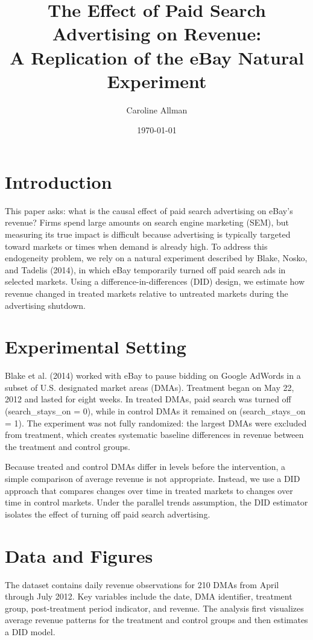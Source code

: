 \documentclass[12pt]{article}
\title{The Effect of Paid Search Advertising on Revenue: \\
A Replication of the eBay Natural Experiment}
\author{Caroline Allman}
\date{\today}
\begin{document}
\maketitle

\section{Introduction}
This paper asks: what is the causal effect of paid search advertising on eBay's revenue? Firms spend
large amounts on search engine marketing (SEM), but measuring its true impact is difficult because
advertising is typically targeted toward markets or times when demand is already high. To address this
endogeneity problem, we rely on a natural experiment described by Blake, Nosko, and Tadelis (2014),
in which eBay temporarily turned off paid search ads in selected markets. Using a difference-in-differences
(DID) design, we estimate how revenue changed in treated markets relative to untreated markets during
the advertising shutdown.

\section{Experimental Setting}
Blake et al. (2014) worked with eBay to pause bidding on Google AdWords in a subset of U.S. designated
market areas (DMAs). Treatment began on May 22, 2012 and lasted for eight weeks. In treated DMAs,
paid search was turned off (search\_stays\_on = 0), while in control DMAs it remained on
(search\_stays\_on = 1). The experiment was not fully randomized: the largest DMAs were excluded from
treatment, which creates systematic baseline differences in revenue between the treatment and control groups.

Because treated and control DMAs differ in levels before the intervention, a simple comparison of average
revenue is not appropriate. Instead, we use a DID approach that compares changes over time in treated
markets to changes over time in control markets. Under the parallel trends assumption, the DID estimator
isolates the effect of turning off paid search advertising.

\section{Data and Figures}
The dataset contains daily revenue observations for 210 DMAs from April through July 2012. Key variables
include the date, DMA identifier, treatment group, post-treatment period indicator, and revenue. The
analysis first visualizes average revenue patterns for the treatment and control groups and then estimates
a DID model.
\end{document}
